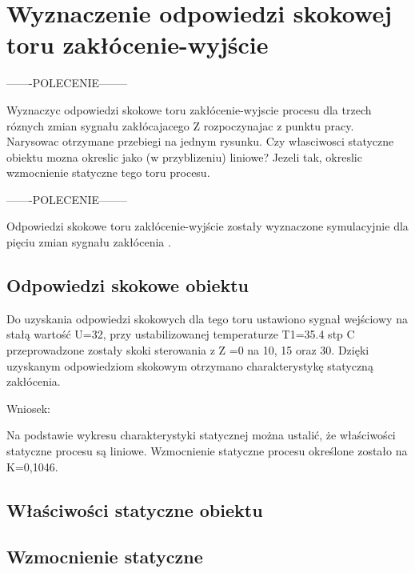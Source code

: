 \section{Wyznaczenie odpowiedzi skokowej toru zakłócenie-wyjście}


-------POLECENIE--------

Wyznaczyc odpowiedzi skokowe toru zakłócenie-wyjscie procesu dla trzech róznych
zmian sygnału zakłócajacego Z rozpoczynajac z punktu pracy. Narysowac otrzymane
przebiegi na jednym rysunku. Czy własciwosci statyczne obiektu mozna okreslic jako
(w przyblizeniu) liniowe? Jezeli tak, okreslic wzmocnienie statyczne tego toru procesu.

-------POLECENIE--------

Odpowiedzi skokowe toru zakłócenie-wyjście zostały wyznaczone symulacyjnie dla pięciu
zmian sygnału zakłócenia .

\subsection{Odpowiedzi skokowe obiektu}

Do uzyskania odpowiedzi skokowych dla tego toru ustawiono sygnał wejściowy na stałą
wartość U=32, 
przy ustabilizowanej temperaturze T1=35.4 stp C przeprowadzone zostały
skoki sterowania z Z =0 na 10, 15 oraz 30.
Dzięki uzyskanym odpowiedziom skokowym otrzymano charakterystykę statyczną
zakłócenia.

Wniosek: 

Na podstawie wykresu charakterystyki statycznej można ustalić, 
że właściwości statyczne procesu są liniowe. 
Wzmocnienie statyczne procesu określone zostało na K=0,1046.

\subsection{Właściwości statyczne obiektu}

\subsection{Wzmocnienie statyczne}

